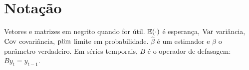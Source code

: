\section*{Notação}
Vetores e matrizes em negrito quando for útil. $\mathbb{E}(\cdot)$ é esperança, $\operatorname{Var}$ variância, $\operatorname{Cov}$ covariância, $\operatorname{plim}$ limite em probabilidade. $\hat\beta$ é um estimador e $\beta$ o parâmetro verdadeiro. Em séries temporais, $B$ é o operador de defasagem: $B y_t = y_{t-1}$.
